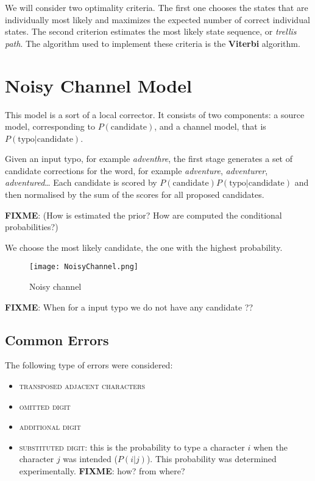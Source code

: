 We will consider two optimality criteria. The first one chooses the states that are individually most likely and maximizes the 
expected number of correct individual states. The second criterion estimates the most likely state sequence, or 
\textit{trellis path}. The algorithm used to implement these criteria is the \textbf{Viterbi} algorithm. %

\section{Noisy Channel Model}

This model is a sort of a local corrector. It consists of two components: a source model, corresponding to 
$P(\text{candidate})$, and a channel model, 
that is $P(\text{typo}|\text{candidate})$.


Given an input typo, for example \textsl{adventhre}, the first stage generates a set of candidate corrections for the word, 
for example \textsl{adventure}, \textsl{adventurer}, \textsl{adventured}…
Each candidate is scored by $P(\text{candidate})P(\text{typo}|\text{candidate})$ and then normalised by the sum of the 
scores for all proposed candidates.

\textbf{FIXME}:  (How is estimated the prior? How are computed the conditional probabilities?)

We choose the most likely candidate, the one with the highest probability.

\begin{figure}[H]
	\centering
	\texttt{[image: NoisyChannel.png]}
	\caption{Noisy channel}
	\label{fig:noisychannel}
\end{figure}

\textbf{FIXME}: When for a input typo we do not have any candidate ?? 


\subsection{Common Errors}
The following type of errors were considered:
\begin{itemize}
	\item \textsc{transposed adjacent characters}
	\item \textsc{omitted digit}
	\item \textsc{additional digit}
	\item \textsc{substituted digit}: this is the probability to type a
	character $i$ when the character $j$ was intended ($P(i|j)$). This 
	probability was determined experimentally. \textbf{FIXME}: how? from where?
\end{itemize}

